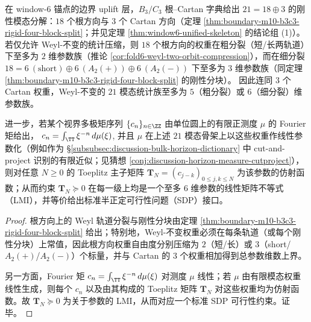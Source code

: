 \begin{proposition}\label{prop:xi-horizon-21mode-weyl-compression}
在 window-\(6\) 锚点的边界 uplift 层，\(B_3/C_3\) 根--Cartan 字典给出
\(
21=18\oplus 3
\)
的刚性模态分解：\(18\) 个根方向与 \(3\) 个 Cartan 方向（定理 \ref{thm:boundary-m10-b3c3-rigid-four-block-split}；并见定理 \ref{thm:window6-unified-skeleton} 的结论组 (1)）。
若仅允许 Weyl-不变的统计压缩，则 \(18\) 个根方向的权重在粗分裂（短/长两轨道）下至多为 \(2\) 维参数族（推论 \ref{cor:fold6-weyl-two-orbit-compression}），而在细分裂
\(
18=6\ (\mathrm{short})\oplus 6\ (A_2(+))\oplus 6\ (A_2(-))
\)
下至多为 \(3\) 维参数族（同定理 \ref{thm:boundary-m10-b3c3-rigid-four-block-split} 的刚性分块）。
因此连同 \(3\) 个 Cartan 权重，Weyl-不变的 \(21\) 模态统计族至多为 \(5\)（粗分裂）或 \(6\)（细分裂）维参数族。
\par
进一步，若某个视界多极矩序列 \(\{c_n\}_{n\in\ZZ}\) 由单位圆上的有限正测度 \(\mu\) 的 Fourier 矩给出，
\(
c_n=\int_{\TT}\xi^{-n}\,d\mu(\xi)
\),
并且 \(\mu\) 在上述 \(21\) 模态骨架上以这些权重作线性参数化（例如作为 \S\ref{subsubsec:discussion-bulk-horizon-dictionary} 中 cut-and-project 识别的有限近似；见猜想 \ref{conj:discussion-horizon-measure-cutproject}），
则对任意 \(N\ge 0\) 的 Toeplitz 主子矩阵
\(
\mathbf{T}_N=(c_{j-k})_{0\le j,k\le N}
\)
为该参数的仿射函数；从而约束 \(\mathbf{T}_N\succeq 0\) 在每一级上均是一个至多 \(6\) 维参数的线性矩阵不等式（LMI），并等价给出标准半正定可行性问题（SDP）接口。
\end{proposition}
\begin{proof}
根方向上的 Weyl 轨道分裂与刚性分块由定理 \ref{thm:boundary-m10-b3c3-rigid-four-block-split} 给出；特别地，Weyl-不变权重必须在每条轨道（或每个刚性分块）上常值，因此根方向权重自由度分别压缩为 \(2\)（短/长）或 \(3\)（short/\(A_2(+)\)/\(A_2(-)\)）个标量，并与 Cartan 的 \(3\) 个权重相加得到总参数维数上界。
\par
另一方面，Fourier 矩 \(c_n=\int_{\TT}\xi^{-n}\,d\mu(\xi)\) 对测度 \(\mu\) 线性；若 \(\mu\) 由有限模态权重线性生成，则每个 \(c_n\) 以及由其构成的 Toeplitz 矩阵 \(\mathbf{T}_N\) 对这些权重均为仿射函数。故 \(\mathbf{T}_N\succeq 0\) 为关于参数的 LMI，从而对应一个标准 SDP 可行性约束。证毕。
\end{proof}


